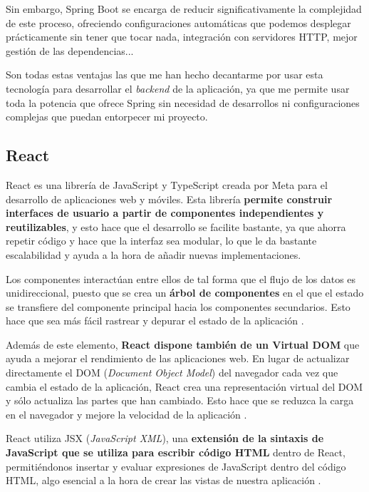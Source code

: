 Sin embargo, Spring Boot se encarga de reducir significativamente la complejidad de este proceso, ofreciendo configuraciones automáticas que podemos desplegar prácticamente sin tener que tocar nada, integración con servidores HTTP, mejor gestión de las dependencias... \cite{arquitectura-java:spring-boot}

Son todas estas ventajas las que me han hecho decantarme por usar esta tecnología para desarrollar el \textit{backend} de la aplicación, ya que me permite usar toda la potencia que ofrece Spring sin necesidad de desarrollos ni configuraciones complejas que puedan entorpecer mi proyecto.

\subsection{React}

React es una librería de JavaScript y TypeScript creada por Meta para el desarrollo de aplicaciones web y móviles. Esta librería \textbf{permite construir interfaces de usuario a partir de componentes independientes y reutilizables}, y esto hace que el desarrollo se facilite bastante, ya que ahorra repetir código y hace que la interfaz sea modular, lo que le da bastante escalabilidad y ayuda a la hora de añadir nuevas implementaciones.

Los componentes interactúan entre ellos de tal forma que el flujo de los datos es unidireccional, puesto que se crea un \textbf{árbol de componentes} en el que el estado se transfiere del componente principal hacia los componentes secundarios. Esto hace que sea más fácil rastrear y depurar el estado de la aplicación \cite{kinsta:react}.


Además de este elemento, \textbf{React dispone también de un Virtual DOM} que ayuda a mejorar el rendimiento de las aplicaciones web. En lugar de actualizar directamente el DOM (\textit{Document Object Model}) del navegador cada vez que cambia el estado de la aplicación, React crea una representación virtual del DOM y sólo actualiza las partes que han cambiado. Esto hace que se reduzca la carga en el navegador y mejore la velocidad de la aplicación \cite{geeksforgeeks:virtual-dom}.


React utiliza JSX (\textit{JavaScript XML}), una \textbf{extensión de la sintaxis de JavaScript que se utiliza para escribir código HTML} dentro de React, permitiéndonos insertar y evaluar expresiones de JavaScript dentro del código HTML, algo esencial a la hora de crear las vistas de nuestra aplicación \cite{react-docs:jsx}.

